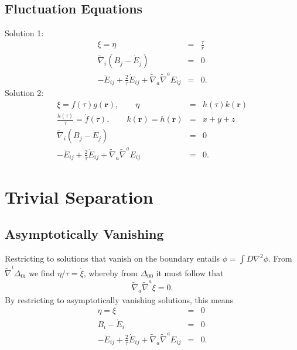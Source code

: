 \documentclass[10pt,letterpaper]{article}
\numberwithin{equation}{section}
\begin{document}
\subsection{Fluctuation Equations}
%
Solution 1:
\begin{eqnarray}
\xi = \eta&=& \frac{\tau}{r}
\nonumber\\
\tilde \nabla_i (B_j-\dot E_j) &=& 0
\nonumber\\
- \ddot E_{ij} + \frac{2}{\tau} \dot E_{ij} + \tilde\nabla_a\tilde\nabla^a E_{ij}  &=& 0.
\end{eqnarray}
Solution 2:
\begin{eqnarray}
\xi = f(\tau)g(\mathbf r),\qquad \eta &=& h(\tau)k(\mathbf r)
\nonumber\\
\frac{h(\tau)}{\tau} = \dot f(\tau),\qquad k(\mathbf r)= h(\mathbf r) &=& x+y+z
\nonumber\\
\tilde \nabla_i (B_j-\dot E_j) &=& 0
\nonumber\\
- \ddot E_{ij} + \frac{2}{\tau} \dot E_{ij} + \tilde\nabla_a\tilde\nabla^a E_{ij}  &=& 0.
\end{eqnarray}

\section{Trivial Separation}

\subsection{Asymptotically Vanishing}
Restricting to solutions that vanish on the boundary entails $\phi = \int D \nabla^2\phi$. From $\tilde\nabla^i \Delta_{0i}$ we find $\eta/\tau=\dot\xi$, whereby from $\Delta_{00}$ it must follow that
\begin{eqnarray}
\tilde\nabla_a\tilde\nabla^a\xi = 0.
\end{eqnarray}
By restricting to asymptotically vanishing solutions, this means
\begin{eqnarray}
\eta=\xi&=&0
\nonumber\\
B_i-\dot E_i&=&0
\nonumber\\
- \ddot E_{ij} + \frac{2}{\tau} \dot E_{ij} + \tilde\nabla_a\tilde\nabla^a E_{ij}  &=& 0.
\end{eqnarray}
\end{document}
